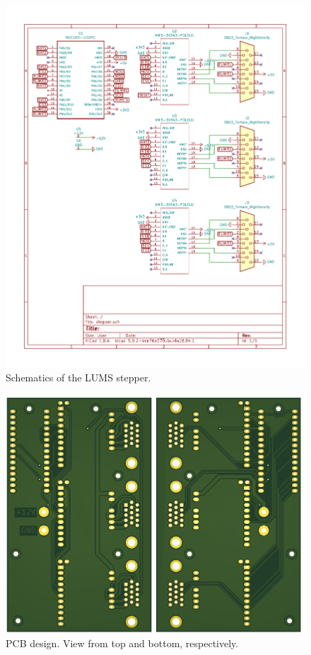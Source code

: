 \documentclass[10pt,article]{article}
\begin{document}
\begin{figure}[h]
 \centering
 \includegraphics[width = \textwidth]{schematics.pdf}
\caption {Schematics of the LUMS stepper.} \label{schematics}
\end{figure}


\begin{figure}[h]
 \centering
 \includegraphics[width = 14cm]{render.png}
\caption {PCB design. View from top and bottom, respectively.} \label{pcb}
\end{figure}
\end{document}

